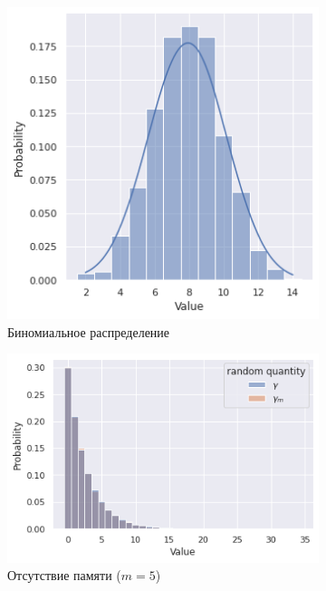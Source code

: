         \begin{figure}[tbp]
            \centering
            \begin{subfigure}[b]{0.4\textwidth}
                \centering
                \includegraphics[width=\textwidth]{resources/task1_bin.png}
                \caption{Биномиальное распределение}
                \label{task1_bin}
            \end{subfigure}
            \hfill
            \begin{subfigure}[b]{0.5\textwidth}
                \centering
                \includegraphics[width=\textwidth]{resources/task1_memo.png}
                \caption{Отсутствие памяти ($m = 5$)}
                \label{task1_memo}
            \end{subfigure}
            \caption{}
        \end{figure}


